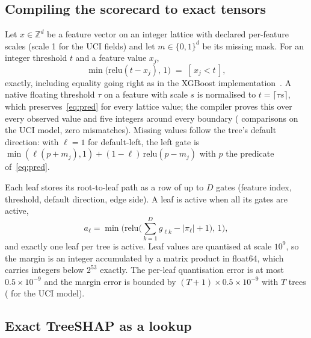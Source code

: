 \documentclass[twocolumn,10pt]{article}
\begin{document}
\subsection{Compiling the scorecard to exact tensors}
\label{sec:compile}

Let $x \in \mathbb{Z}^{d}$ be a feature vector on an integer lattice with declared per-feature scales (scale 1 for the UCI
fields) and let $m \in \{0,1\}^{d}$ be its missing mask. For an integer threshold $t$ and a feature value $x_j$,
\begin{equation}
\min\!\big(\mathrm{relu}(t - x_j),\, 1\big) \;=\; [\,x_j < t\,],
\label{eq:pred}
\end{equation}
exactly, including equality going right as in the XGBoost implementation~\cite{chen2016xgboost,xgboostcode}. A native floating threshold $\tau$ on a
feature with scale $s$ is normalised to $t = \lceil \tau s \rceil$, which preserves~\eqref{eq:pred} for every lattice
value; the compiler proves this over every observed value and five integers around every boundary
(\nThresholdChecks{} comparisons on the UCI model, zero mismatches). Missing values follow the tree's default direction:
with $\ell = 1$ for default-left, the left gate is $\min(\ell(p + m_j), 1) + (1-\ell)\,\mathrm{relu}(p - m_j)$ with $p$
the predicate of~\eqref{eq:pred}.

Each leaf stores its root-to-leaf path as a row of up to $D$ gates (feature index, threshold, default direction, edge
side). A leaf is active when all its gates are active,
\begin{equation}
a_\ell = \min\!\Big(\mathrm{relu}\Big(\sum_{k=1}^{D} g_{\ell k} - |\pi_\ell| + 1\Big),\, 1\Big),
\end{equation}
and exactly one leaf per tree is active. Leaf values are quantised at scale $10^{9}$, so the margin is an integer
accumulated by a matrix product in float64, which carries integers below $2^{53}$ exactly. The per-leaf quantisation error
is at most $0.5\times10^{-9}$ and the margin error is bounded by $(T+1)\times 0.5\times10^{-9}$ with $T$ trees
(\nQuantBound{} for the UCI model).

\subsection{Exact TreeSHAP as a lookup}
\end{document}
